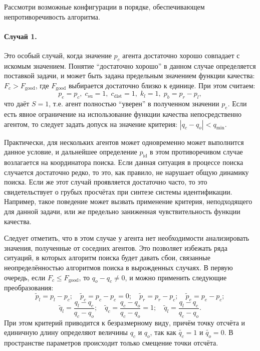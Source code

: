 Рассмотри возможные конфигурации в порядке,
обеспечивающем непротиворечивость алгоритма.

\paragraph{Случай 1.}
Это особый случай, когда значение $p_c$ агента
достаточно хорошо совпадает с искомым значением.
Понятие ``достаточно хорошо'' в данном случае определяется
поставкой задачи, и может быть задана предельным значением
функции качества: $F_c > F_{\mathrm{good}}$, где $F_{\mathrm{good}}$
выбирается достаточно близко к единице.
При этом считаем:
%
\[
p_e = p_c, \; c_\mathrm{su} = 1, \;  c_\mathrm{dist} = 1, \;  k_l = 1, \;  p_b = p_r - p_l,
\]
%
что даёт $S = 1$, т.е. агент полностью ``уверен''
в полученном значении $p_e$. Если есть явное ограничение
на использование функции качества непосредственно агентом,
то следует задать допуск на значение критерия:
$ |q_c-q_o| < q_{\min}$.

Практически, для нескольких агентов может одновременно
может выполнится данное условие, и
дальнейшее определение $p_\mathrm{id}$ в этом противоречивом случае
возлагается на координатора поиска. Если данная
ситуация в процессе поиска случается достаточно редко,
то это, как правило, не нарушает общую динамику поиска.
Если же этот случай проявляется достаточно часто,
то это свидетельствует о грубых просчётах
при синтезе системы идентификации.
Например, такое поведение может вызвать применение
критерия, неподходящего для данной задачи,
или же предельно заниженная чувствительность функции качества.

Следует отметить, что в этом случае у агента нет необходимости
анализировать значения, полученные от соседних агентов.
Это позволяет избежать ряда ситуаций, в которых
алгоритм поиска будет давать сбои, связанные неопределённостью
алгоритмов поиска в вырожденных случаях.
В первую очередь,
если $F_c \le F_\mathrm{good}$, то $q_o -q_c \ne 0$,
и можно применить следующие преобразования:
%
\[
  \tilde{p}_l = p_l - p_c;
  \quad
  \tilde{p}_c = p_c - p_c = 0;
  \quad
  \tilde{p}_r = p_r - p_c;
  \quad
  \tilde{p}_e = p_e - p_c;
\]
\begin{equation}
  \tilde{q}_l = \frac{q_l-q_c}{q_c-q_o};
  \quad
  \tilde{q}_c = \frac{q_c-q_o}{q_c-q_o} = 1;
  \quad
  \tilde{q}_l = \frac{q_l-q_c}{q_c-q_o}.
  \label{atu:eq:q_agent_rel}
\end{equation}
%
При этом критерий приводится к безразмерному виду,
причём точку отсчёта и единичную длину определяют величины
$q_c$ и $q_o$, так как $\tilde{q_c} = 1$ и $\tilde{q_o} = 0$.
В пространстве параметров происходит только смещение точки отсчёта.

